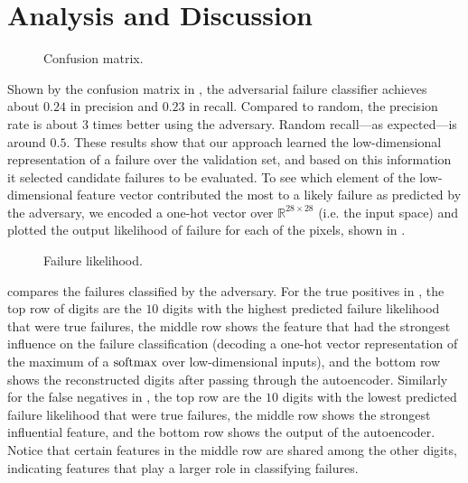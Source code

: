 \section{Analysis and Discussion}
\begin{figure}
  \vspace{-30pt}
  \centering
  \resizebox{0.3\textwidth}{!}{}
  \caption{Confusion matrix.}
  \label{fig:confusion_adversary}
\end{figure}
Shown by the confusion matrix in , the adversarial failure classifier achieves about $0.24$ in precision and $0.23$ in recall.
Compared to random, the precision rate is about $3$ times better using the adversary. Random recall---as expected---is around $0.5$.
These results show that our approach learned the low-dimensional representation of a failure over the validation set, and based on this information it selected candidate failures to be evaluated.
To see which element of the low-dimensional feature vector contributed the most to a likely failure as predicted by the adversary, we encoded a one-hot vector over $\mathbb{R}^{28\times28}$ (i.e. the input space) and plotted the output likelihood of failure for each of the pixels, shown in .

\begin{figure}
  \centering
  \resizebox{0.3\textwidth}{!}{}
  \caption{Failure likelihood.}
  \label{fig:failure_likelihood}
\end{figure}

 compares the failures classified by the adversary.
For the true positives in , the top row of digits are the $10$ digits with the highest predicted failure likelihood that were true failures, the middle row shows the feature that had the strongest influence on the failure classification (decoding a one-hot vector representation of the maximum of a $\operatorname{softmax}$ over low-dimensional inputs), and the bottom row shows the reconstructed digits after passing through the autoencoder.
Similarly for the false negatives in , the top row are the $10$ digits with the lowest predicted failure likelihood that were true failures, the middle row shows the strongest influential feature, and the bottom row shows the output of the autoencoder. Notice that certain features in the middle row are shared among the other digits, indicating features that play a larger role in classifying failures.

